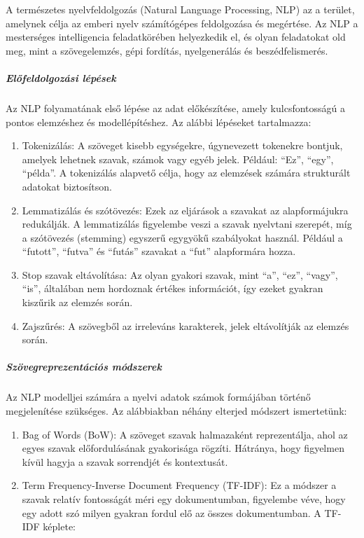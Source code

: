 \documentclass[11pt]{article}
\begin{document}
A természetes nyelvfeldolgozás (Natural Language Processing, NLP) az a
terület, amelynek célja az emberi nyelv számítógépes feldolgozása és
megértése. Az NLP a mesterséges intelligencia feladatkörében helyezkedik
el, és olyan feladatokat old meg, mint a szövegelemzés, gépi fordítás,
nyelgenerálás és beszédfelismerés.

\subparagraph{Előfeldolgozási
lépések}\label{elux151feldolgozuxe1si-luxe9puxe9sek}

Az NLP folyamatának első lépése az adat előkészítése, amely
kulcsfontosságú a pontos elemzéshez és modellépítéshez. Az alábbi
lépéseket tartalmazza:

\begin{enumerate}
\def\labelenumi{\arabic{enumi}.}
\item
  Tokenizálás: A szöveget kisebb egységekre, úgynevezett tokenekre
  bontjuk, amelyek lehetnek szavak, számok vagy egyéb jelek. Például:
  ``Ez'', ``egy'', ``példa''. A tokenizálás alapvető célja, hogy az
  elemzések számára strukturált adatokat biztosítson.
\item
  Lemmatizálás és szótövezés: Ezek az eljárások a szavakat az
  alapformájukra redukálják. A lemmatizálás figyelembe veszi a szavak
  nyelvtani szerepét, míg a szótövezés (stemming) egyszerű egygyökű
  szabályokat használ. Például a ``futott'', ``futva'' és ``futás''
  szavakat a ``fut'' alapformára hozza.
\item
  Stop szavak eltávolítása: Az olyan gyakori szavak, mint ``a'', ``ez'',
  ``vagy'', ``is'', általában nem hordoznak értékes információt, így
  ezeket gyakran kiszűrik az elemzés során.
\item
  Zajszűrés: A szövegből az irreleváns karakterek, jelek eltávolítják az
  elemzés során.
\end{enumerate}

\subparagraph{Szövegreprezentációs
módszerek}\label{szuxf6vegreprezentuxe1ciuxf3s-muxf3dszerek}

Az NLP modelljei számára a nyelvi adatok számok formájában történő
megjelenítése szükséges. Az alábbiakban néhány elterjed módszert
ismertetünk:

\begin{enumerate}
\def\labelenumi{\arabic{enumi}.}
\item
  Bag of Words (BoW): A szöveget szavak halmazaként reprezentálja, ahol
  az egyes szavak előfordulásának gyakorisága rögzíti. Hátránya, hogy
  figyelmen kívül hagyja a szavak sorrendjét és kontextusát.
\item
  Term Frequency-Inverse Document Frequency (TF-IDF): Ez a módszer a
  szavak relatív fontosságát méri egy dokumentumban, figyelembe véve,
  hogy egy adott szó milyen gyakran fordul elő az összes dokumentumban.
  A TF-IDF képlete:
\end{enumerate}
\end{document}
